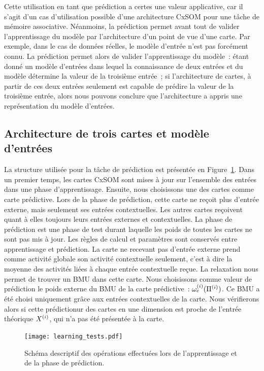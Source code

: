 \documentclass[../main]{subfiles}
\begin{document}
Cette utilisation en tant que prédiction a certes une valeur applicative, car il s'agit d'un cas d'utilisation possible d'une architecture CxSOM pour une tâche de mémoire associative. Néanmoins, la prédiction permet avant tout de valider l'apprentissage du modèle par l'architecture d'un point de vue d'une carte. Par exemple, dans le cas de données réelles, le modèle d'entrée n'est pas forcément connu. 
La prédiction permet alors de valider l'apprentissage du modèle~: étant donné un modèle d'entrées dans lequel la connaissance de deux entrées et du modèle détermine la valeur de la troisième entrée~; si l'architecture de cartes, à partir de ces deux entrées seulement est capable de prédire la valeur de la troisième entrée, alors nous pouvons conclure que l'architecture a appris une représentation du modèle d'entrées.

\subsection{Architecture de trois cartes et modèle d'entrées}

La structure utilisée pour la tâche de prédiction est présentée en Figure~\ref{fig:schema_pred}. 
Dans un premier temps, les cartes CxSOM sont mises à jour sur l'ensemble des entrées dans une phase d'apprentissage. 
Ensuite, nous choisissons une des cartes comme carte prédictive. Lors de la phase de prédiction, cette carte ne reçoit plus d'entrée externe, mais seulement ses entrées contextuelles. 
Les autres cartes reçoivent quant à elles toujours leurs entrées externes et contextuelles. 
La phase de prédiction est une phase de test durant laquelle les poids de toutes les cartes ne sont pas mis à jour. Les règles de calcul et paramètres sont conservés entre apprentissage et prédiction.
La carte ne recevant pas d'entrée externe prend comme activité globale son activité contextuelle seulement, c'est à dire la moyenne des activités liées à chaque entrée contextuelle reçue. La relaxation nous permet de trouver un BMU dans cette carte.
Nous choisissons comme valeur de prédiction le poids externe du BMU de la carte prédictive~: $\omega_{e}^{({i})}(\Pi^{({i})})$. Ce BMU a été choisi uniquement grâce aux entrées contextuelles de la carte. Nous vérifierons alors si cette prédictionur des cartes en une dimension est proche de l'entrée théorique $X^{({i})}$, qui n'a pas été présentée à la carte.

\begin{figure}
	\texttt{[image: learning\_tests.pdf]}
	\caption{Schéma descriptif des opérations effectuées lors de l'apprentissage et de la phase de prédiction.\label{fig:schema_pred}}
\end{figure}
\end{document}
